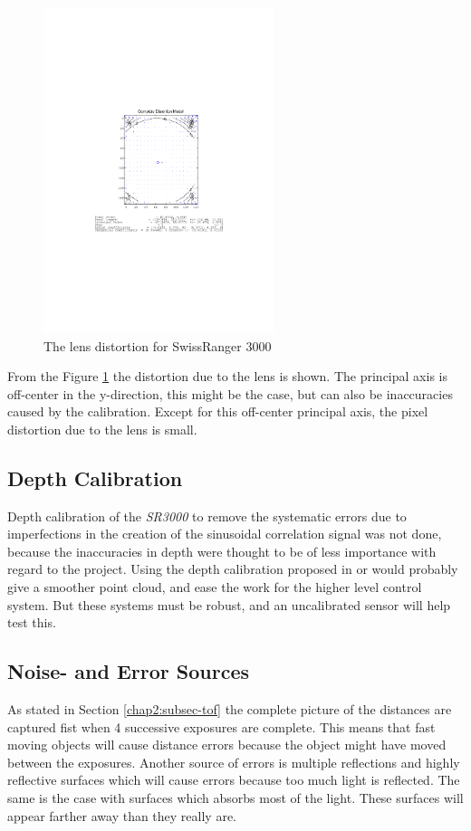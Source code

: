 \begin{figure}[htbp]
    \centering
    \includegraphics[width=0.6\textwidth]{pics/sr3000_comp_dist}
    \caption{The lens distortion for SwissRanger 3000}
    \label{chap3:fig-sr3000-comp-lensdist}
\end{figure}

From the Figure \ref{chap3:fig-sr3000-comp-lensdist} the distortion due to the lens is shown.
The principal axis is off-center in the y-direction, this might be the case, but can also
be inaccuracies caused by the calibration. Except for this off-center principal axis, the
pixel distortion due to the lens is small.


\subsection{Depth Calibration}
\label{chap3:subsec-depht-calib}
Depth calibration of the \emph{SR3000} to remove the systematic errors due to
imperfections in the creation of the sinusoidal correlation signal was not done, 
because the inaccuracies in depth
were thought to be of less importance with regard to the project. Using the depth
calibration proposed in \cite{sr3000} or \cite{tof-calibration} would probably give a
smoother point cloud, and ease the work for the higher level control system. But these
systems must be robust, and an uncalibrated sensor will help test this. 



\subsection{Noise- and Error Sources}
As stated in Section \ref{chap2:subsec-tof} the complete picture of the distances are
captured fist when 4 successive exposures are complete. This means that fast moving
objects will cause distance errors because the object might have moved between the
exposures. Another source of errors is multiple reflections and highly reflective
surfaces which will cause errors because too much light is reflected. The same is the case
with surfaces which absorbs most of the light. These surfaces will appear farther away than
they really are. 


